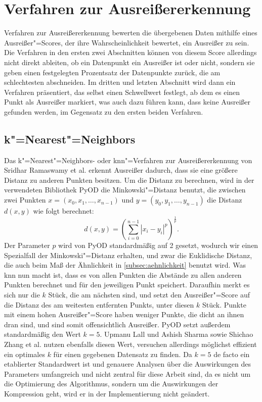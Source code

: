 \section{Verfahren zur Ausreißererkennung}
Verfahren zur Ausreißererkennung bewerten die übergebenen Daten mithilfe eines Ausreißer"=Scores, der ihre Wahrscheinlichkeit bewertet, ein Ausreißer zu sein. Die Verfahren in den ersten zwei Abschnitten können von diesem Score allerdings nicht direkt ableiten, ob ein Datenpunkt ein Ausreißer ist oder nicht, sondern sie geben einen festgelegten Prozentsatz der Datenpunkte zurück, die am schlechtesten abschneiden. Im dritten und letzten Abschnitt wird dann ein Verfahren präsentiert, das selbst einen Schwellwert festlegt, ab dem es einen Punkt als Ausreißer markiert, was auch dazu führen kann, dass keine Ausreißer gefunden werden, im Gegensatz zu den ersten beiden Verfahren.

\subsection{k"=Nearest"=Neighbors}
Das k"=Nearest"=Neighbors- oder knn"=Verfahren zur Ausreißererkennung von Sridhar Ramaswamy et al. \cite{knn} erkennt Ausreißer dadurch, dass sie eine größere Distanz zu anderen Punkten besitzen. Um die Distanz zu berechnen, wird in der verwendeten Bibliothek PyOD \cite{pyod} die Minkowski"=Distanz \cite{minkowski} benutzt, die zwischen zwei Punkten $x = (x_0,x_1,\ldots,x_{n-1})$ und $y=(y_0,y_1,\ldots,y_{n-1})$ die Distanz $d(x,y)$ wie folgt berechnet:
\[d(x,y) = \left(\sum_{i=0}^{n-1}|x_i - y_i|^p\right)^{\frac{1}{p}}.\]
Der Parameter $p$ wird von PyOD standardmäßig auf 2 gesetzt, wodurch wir einen Spezialfall der Minkowski"=Distanz erhalten, und zwar die Euklidische Distanz, die auch beim Maß der Ähnlichkeit in \autoref{subsec:aehnlichkeit} benutzt wird. Was knn nun macht ist, dass es von allen Punkten die Abstände zu allen anderen Punkten berechnet und für den jeweiligen Punkt speichert. Daraufhin merkt es sich nur die $k$ Stück, die am nächsten sind, und setzt den Ausreißer"=Score auf die Distanz des am weitesten entfernten Punkts, unter diesen $k$ Stück. Punkte mit einem hohen Ausreißer"=Score haben weniger Punkte, die dicht an ihnen dran sind, und sind somit offensichtlich Ausreißer. PyOD setzt außerdem standardmäßig den Wert $k=5$. Upmanu Lall und Ashish Sharma \cite{kauswahl} sowie Shichao Zhang et al. \cite{kauswahl2} nutzen ebenfalls diesen Wert, versuchen allerdings möglichst effizient ein optimales $k$ für einen gegebenen Datensatz zu finden. Da $k=5$ de facto ein etablierter Standardwert ist und genauere Analysen über die Auswirkungen des Parameters umfangreich \cite{kauswahl2} und nicht zentral für diese Arbeit sind, da es nicht um die Optimierung des Algorithmus, sondern um die Auswirkungen der Kompression geht, wird er in der Implementierung nicht geändert.

